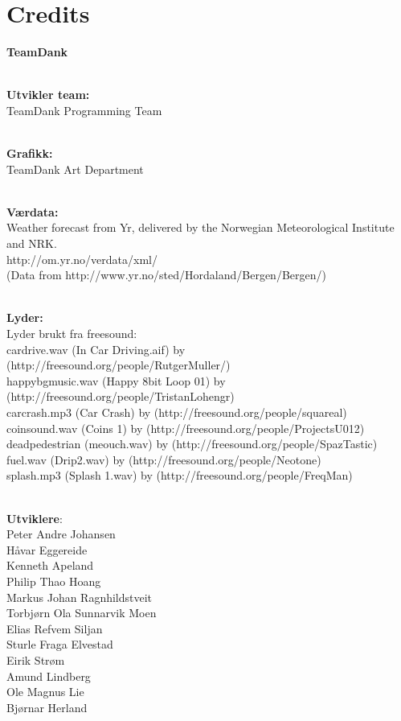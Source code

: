 \documentclass[paper=a4]{article}
\begin{document}
\section{Credits}
\begin{center} 
\textbf{TeamDank}\\ \

\textbf{Utvikler team:}\\
TeamDank Programming Team\\ \

\textbf{Grafikk:} \\
TeamDank Art Department \\ \


\textbf{Værdata:} \\ 
Weather forecast from Yr, delivered by the Norwegian Meteorological Institute and NRK. \\ 
http://om.yr.no/verdata/xml/  \\
(Data from http://www.yr.no/sted/Hordaland/Bergen/Bergen/) \\ \

\textbf{Lyder:} \\ 
Lyder brukt fra freesound: \\
car\textunderscore drive.wav (In Car Driving.aif) by (http://freesound.org/people/RutgerMuller/) \\
happy\textunderscore bgmusic.wav (Happy 8bit Loop 01) by (http://freesound.org/people/Tristan\textunderscore Lohengr) \\
car\textunderscore crash.mp3 (Car Crash) by (http://freesound.org/people/squareal) \\
coin\textunderscore sound.wav (Coins 1) by (http://freesound.org/people/ProjectsU012) \\
dead\textunderscore pedestrian (me\textunderscore ouch.wav) by (http://freesound.org/people/SpazTastic) \\
fuel.wav (Drip2.wav) by (http://freesound.org/people/Neotone) \\
splash.mp3 (Splash 1.wav) by (http://freesound.org/people/FreqMan) \\ \

\textbf{Utviklere}: \\
Peter Andre Johansen \\
Håvar Eggereide \\
Kenneth Apeland \\
Philip Thao Hoang \\
Markus Johan Ragnhildstveit \\
Torbjørn Ola Sunnarvik Moen \\
Elias Refvem Siljan \\
Sturle Fraga Elvestad \\
Eirik Strøm \\
Amund Lindberg \\
Ole Magnus Lie \\
Bjørnar Herland \\ \


\end{center}
\end{document}
